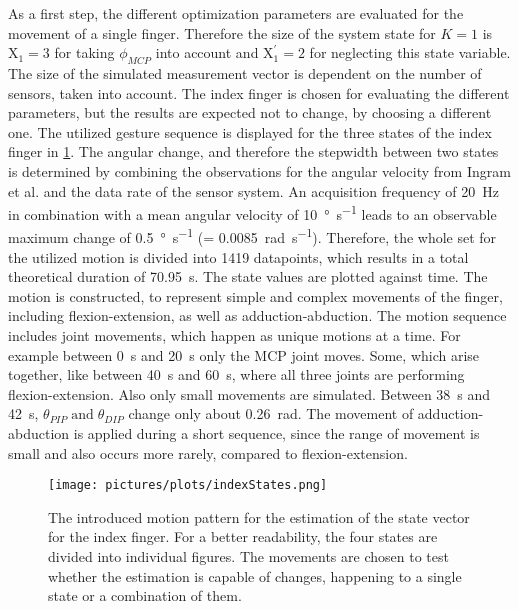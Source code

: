 As a first step, the different optimization parameters are evaluated for the movement of a single finger. Therefore the size of the system state for $ K = 1 $ is $ \mathrm{X}_{1} = 3 $ for taking $ \phi_{MCP} $ into account and $ \mathrm{X}^\prime_{1} = 2 $ for neglecting this state variable. The size of the simulated measurement vector is dependent on the number of sensors, taken into account. The index finger is chosen for evaluating the different parameters, but the results are expected not to change, by choosing a different one. The utilized gesture sequence is displayed for the three states of the index finger in \ref{fig:indexStates}. The angular change, and therefore the stepwidth between two states is determined by combining the observations for the angular velocity from Ingram et al. \cite{ingram2008statistics} and the data rate of the sensor system. An acquisition frequency of \SI{20}{\Hz} in combination with a mean angular velocity of \SI[per-mode=symbol]{10}{\degree \per \second} leads to an observable maximum change of \SI[per-mode=symbol]{0.5}{\degree \per \second} (= \SI[per-mode=symbol]{0.0085}{\radian \per \second}). Therefore, the whole set for the utilized motion is divided into 1419 datapoints, which results in a total theoretical duration of \SI{70.95}{\second}. The state values are plotted against time. The motion is constructed, to represent simple and complex movements of the finger, including flexion-extension, as well as adduction-abduction. The motion sequence includes joint movements, which happen as unique motions at a time. For example between \SI{0}{\second} and \SI{20}{\second} only the \ac{MCP} joint moves. Some, which arise together, like between \SI{40}{\second} and \SI{60}{\second}, where all three joints are performing flexion-extension. Also only small movements are simulated. Between \SI{38}{\second} and \SI{42}{\second}, $ \theta_{PIP} \; \text{and} \; \theta_{DIP} $ change only about \SI{0.26}{\radian}. The movement of adduction-abduction is applied during a short sequence, since the range of movement is small and also occurs more rarely, compared to flexion-extension.\\
\begin{figure}[H]
\centering
\texttt{[image: pictures/plots/indexStates.png]}
\caption[Introduced movement pattern for index finger estimation]
{The introduced motion pattern for the estimation of the state vector for the index finger. For a better readability, the four states are divided into individual figures. The movements are chosen to test whether the estimation is capable of changes, happening to a single state or a combination of them.}
\label{fig:indexStates}
\end{figure}
